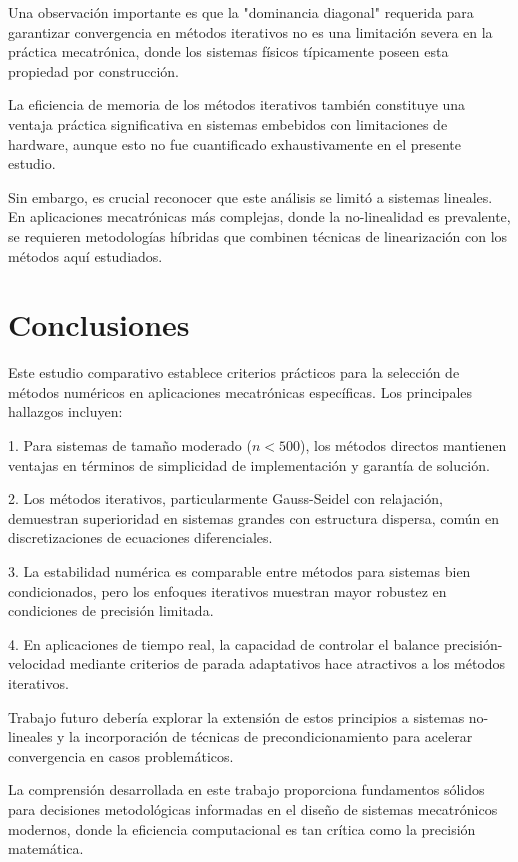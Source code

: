 \documentclass[conference]{IEEEtran}
\begin{document}
Una observación importante es que la "dominancia diagonal" requerida para garantizar convergencia en métodos iterativos no es una limitación severa en la práctica mecatrónica, donde los sistemas físicos típicamente poseen esta propiedad por construcción.

La eficiencia de memoria de los métodos iterativos también constituye una ventaja práctica significativa en sistemas embebidos con limitaciones de hardware, aunque esto no fue cuantificado exhaustivamente en el presente estudio.

Sin embargo, es crucial reconocer que este análisis se limitó a sistemas lineales. En aplicaciones mecatrónicas más complejas, donde la no-linealidad es prevalente, se requieren metodologías híbridas que combinen técnicas de linearización con los métodos aquí estudiados.

\section{Conclusiones}

Este estudio comparativo establece criterios prácticos para la selección de métodos numéricos en aplicaciones mecatrónicas específicas. Los principales hallazgos incluyen:

1. Para sistemas de tamaño moderado ($n < 500$), los métodos directos mantienen ventajas en términos de simplicidad de implementación y garantía de solución.

2. Los métodos iterativos, particularmente Gauss-Seidel con relajación, demuestran superioridad en sistemas grandes con estructura dispersa, común en discretizaciones de ecuaciones diferenciales.

3. La estabilidad numérica es comparable entre métodos para sistemas bien condicionados, pero los enfoques iterativos muestran mayor robustez en condiciones de precisión limitada.

4. En aplicaciones de tiempo real, la capacidad de controlar el balance precisión-velocidad mediante criterios de parada adaptativos hace atractivos a los métodos iterativos.

Trabajo futuro debería explorar la extensión de estos principios a sistemas no-lineales y la incorporación de técnicas de precondicionamiento para acelerar convergencia en casos problemáticos.

La comprensión desarrollada en este trabajo proporciona fundamentos sólidos para decisiones metodológicas informadas en el diseño de sistemas mecatrónicos modernos, donde la eficiencia computacional es tan crítica como la precisión matemática.
\end{document}
